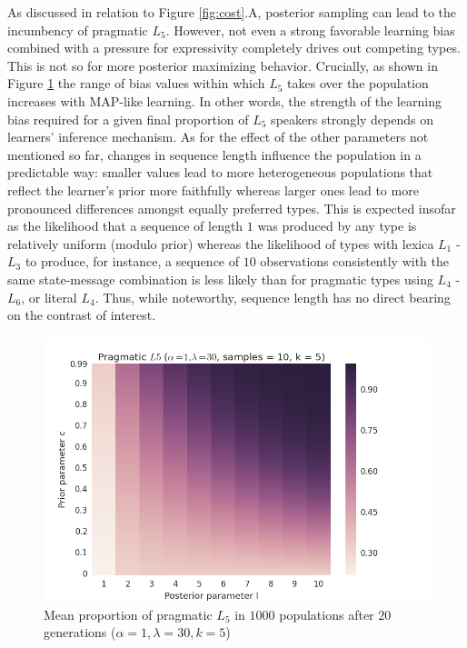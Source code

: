 \documentclass[a4paper]{article}
\begin{document}
As discussed in relation to Figure \ref{fig:cost}.A, posterior sampling can lead to the incumbency of pragmatic $L_5$. However, not even a strong favorable learning bias combined with a pressure for expressivity completely drives out competing types. This is not so for more posterior maximizing behavior. Crucially, as shown in Figure \ref{fig:prior-posterior} the range of bias values within which $L_5$ takes over the population increases with MAP-like learning. In other words, the strength of the learning bias required for a given final proportion of $L_5$ speakers strongly depends on learners' inference mechanism. As for the effect of the other parameters not mentioned so far, changes in sequence length influence the population in a predictable way: smaller values lead to more heterogeneous populations that reflect the learner's prior more faithfully whereas larger ones lead to more pronounced differences amongst equally preferred types. This is expected insofar as the likelihood that a sequence of length $1$ was produced by any type is relatively uniform (modulo prior) whereas the likelihood of types with lexica $L_1$ - $L_3$ to produce, for instance, a sequence of $10$ observations consistently with the same state-message combination is less likely than for pragmatic types using $L_4$ - $L_6$, or literal $L_4$. Thus, while noteworthy, sequence length has no direct bearing on the  contrast of interest.


\begin{figure}
\centering
\includegraphics[scale=.5]{../presentations/01heatmap}
\caption{Mean proportion of pragmatic $L_5$ in $1000$ populations after $20$ generations ($\alpha = 1, \lambda = 30, k = 5$)}
\label{fig:prior-posterior}
\end{figure}
\end{document}
